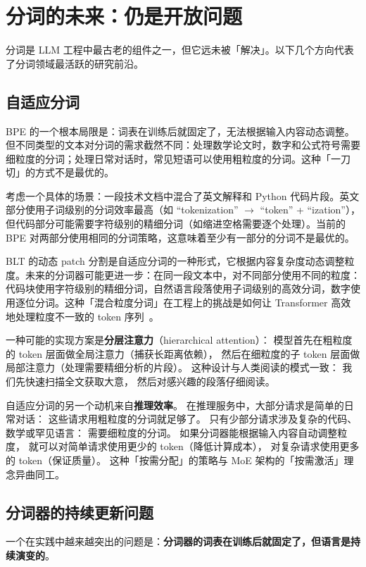 \section{分词的未来：仍是开放问题}

分词是 LLM 工程中最古老的组件之一，但它远未被「解决」。以下几个方向代表了分词领域最活跃的研究前沿。

\subsection{自适应分词}

BPE 的一个根本局限是：词表在训练后就固定了，无法根据输入内容动态调整。但不同类型的文本对分词的需求截然不同：处理数学论文时，数字和公式符号需要细粒度的分词；处理日常对话时，常见短语可以使用粗粒度的分词。这种「一刀切」的方式不是最优的。

考虑一个具体的场景：一段技术文档中混合了英文解释和 Python 代码片段。英文部分使用子词级别的分词效率最高（如 “tokenization” $\to$ “token” + “ization”），但代码部分可能需要字符级别的精细分词（如缩进空格需要逐个处理）。当前的 BPE 对两部分使用相同的分词策略，这意味着至少有一部分的分词不是最优的。

BLT 的动态 patch 分割是自适应分词的一种形式，它根据内容复杂度动态调整粒度。未来的分词器可能更进一步：在同一段文本中，对不同部分使用不同的粒度：代码块使用字符级别的精细分词，自然语言段落使用子词级别的高效分词，数字使用逐位分词。这种「混合粒度分词」在工程上的挑战是如何让 Transformer 高效地处理粒度不一致的 token 序列~\cite{pagnoni2024blt}。

一种可能的实现方案是\textbf{分层注意力}（hierarchical attention）：
模型首先在粗粒度的 token 层面做全局注意力（捕获长距离依赖），
然后在细粒度的子 token 层面做局部注意力（处理需要精细分析的片段）。
这种设计与人类阅读的模式一致：
我们先快速扫描全文获取大意，
然后对感兴趣的段落仔细阅读。

自适应分词的另一个动机来自\textbf{推理效率}。
在推理服务中，大部分请求是简单的日常对话：
这些请求用粗粒度的分词就足够了。
只有少部分请求涉及复杂的代码、数学或罕见语言：
需要细粒度的分词。
如果分词器能根据输入内容自动调整粒度，
就可以对简单请求使用更少的 token（降低计算成本），
对复杂请求使用更多的 token（保证质量）。
这种「按需分配」的策略与 MoE 架构的「按需激活」理念异曲同工。

\subsection{分词器的持续更新问题}

一个在实践中越来越突出的问题是：\textbf{分词器的词表在训练后就固定了，但语言是持续演变的}。


